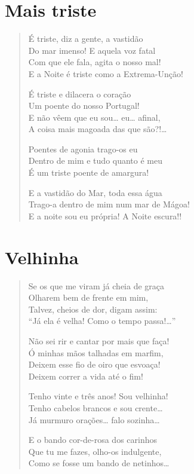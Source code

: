 \chapter{Mais triste}

\begin{verse}
É triste, diz a gente, a vastidão\\
Do mar imenso! E aquela voz fatal\\
Com que ele fala, agita o nosso mal!\\
E a Noite é triste como a Extrema-Unção!

É triste e dilacera o coração\\
Um poente do nosso Portugal!\\
E não vêem que eu sou\ldots{} eu\ldots{} afinal,\\
A coisa mais magoada das que são?!\ldots{}

Poentes de agonia trago-os eu\\
Dentro de mim e tudo quanto é meu\\
É um triste poente de amargura!

E a vastidão do Mar, toda essa água\\
Trago-a dentro de mim num mar de Mágoa!\\
E a noite sou eu própria! A Noite escura!! 
\end{verse}

\chapter{Velhinha}

\begin{verse}
Se os que me viram já cheia de graça\\
Olharem bem de frente em mim,\\
Talvez, cheios de dor, digam assim:\\
“Já ela é velha! Como o tempo passa!\ldots{}”

Não sei rir e cantar por mais que faça!\\
Ó minhas mãos talhadas em marfim,\\
Deixem esse fio de oiro que esvoaça!\\
Deixem correr a vida até o fim! 

Tenho vinte e três anos! Sou velhinha!\\
Tenho cabelos brancos e sou crente\ldots{}\\
Já murmuro orações\ldots{} falo sozinha\ldots{}

E o bando cor-de-rosa dos carinhos\\
Que tu me fazes, olho-os indulgente,\\
Como se fosse um bando de netinhos\ldots{} 
\end{verse}

